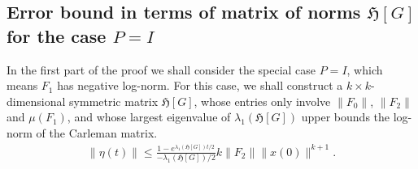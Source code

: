 \documentclass[superscriptaddress,onecolumn,nofootinbib,longbibliography,a4paper,accepted=2026-09-29]{quantumarticle}
\theoremstyle{plain}
\theoremstyle{definition}
\numberwithin{thm}{section}
\numberwithin{assumption}{section}
\numberwithin{lemma}{section}
\numberwithin{prop}{section}
\numberwithin{cor}{section}
\numberwithin{definition}{section}
\numberwithin{rmk}{section}
\numberwithin{equation}{section}
\newcommand{\hh}[1]{\ensuremath{\mathfrak{H}\left[#1\right]}}
\begin{document}
\subsection{Error bound in terms of matrix of norms \texorpdfstring{$\hh{G}$ }{}for the case \texorpdfstring{$P=I$}{P=I}}

In the first part of the proof we shall consider the special case $P=I$, which means $F_1$ has negative log-norm. For this case, we shall construct a $k \times k$-dimensional symmetric matrix $\hh{G}$, whose entries only involve $\|F_0\|$, $\|F_2\|$ and $\mu(F_1)$, and whose largest eigenvalue of $\lambda_1(\hh{G})$ upper bounds the log-norm of the Carleman matrix. 
\begin{align}
\label{eq:Carlemanerrorboundproof}
    \| \eta(t)\| \leq \frac{1- e^{\lambda_1(\hh{G}) t/2}}{-\lambda_1(\hh{G})/2 } k \| F_2\| \| x(0)\|^{k+1}.
\end{align}
\end{document}
